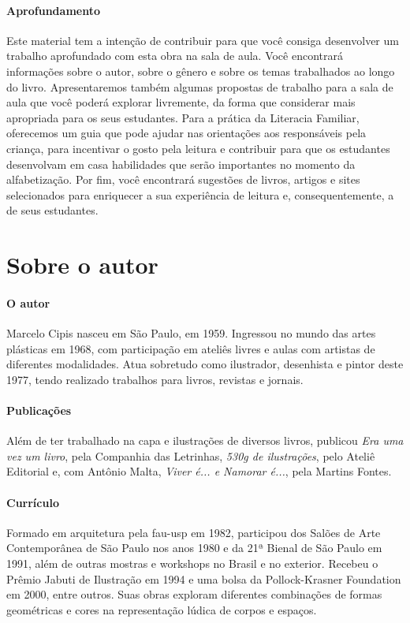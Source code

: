 \documentclass[11pt]{extarticle}
\begin{document}
\paragraph{Aprofundamento} Este material tem a 
intenção de contribuir para que você consiga desenvolver um trabalho aprofundado 
com esta obra na sala de aula. Você encontrará informações sobre o autor, sobre 
o gênero e sobre os temas trabalhados ao longo do livro. Apresentaremos também 
algumas propostas de trabalho para a sala de aula que você poderá explorar livremente, 
da forma que considerar mais apropriada para os seus estudantes. Para a prática 
da Literacia Familiar, oferecemos um guia que pode ajudar nas orientações aos 
responsáveis pela criança, para incentivar o gosto pela leitura e contribuir para 
que os estudantes desenvolvam em casa habilidades que serão importantes no momento 
da alfabetização. Por fim, você encontrará sugestões de livros, artigos e sites 
selecionados para enriquecer a sua experiência de leitura e, 
consequentemente, a de seus estudantes.



\section{Sobre o autor}

\paragraph{O autor} 
Marcelo Cipis nasceu em São Paulo, em 1959. 
Ingressou no mundo das artes plásticas em 1968, com participação em ateliês 
livres e aulas com artistas de diferentes modalidades. Atua sobretudo como 
ilustrador, desenhista e pintor deste 1977, tendo realizado trabalhos para 
livros, revistas e jornais.
\paragraph{Publicações} 
Além de ter trabalhado na capa e ilustrações de diversos livros, 
publicou \emph{Era uma vez um livro}, pela Companhia das Letrinhas, \emph{530g de ilustrações}, pelo Ateliê Editorial e, com Antônio Malta, \emph{Viver é... e Namorar é...}, pela Martins Fontes.
\paragraph{Currículo} 
Formado em arquitetura pela fau-usp em 1982, participou dos Salões de Arte 
Contemporânea de São Paulo nos anos 1980 e da 21ª Bienal de São Paulo em 1991, 
além de outras mostras e workshops no Brasil e no exterior. Recebeu o Prêmio 
Jabuti de Ilustração em 1994 e uma bolsa da Pollock-Krasner Foundation em 2000, 
entre outros. Suas obras exploram diferentes combinações de formas geométricas 
e cores na representação lúdica de corpos e espaços.
\end{document}
